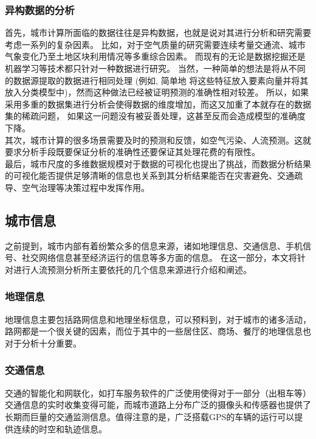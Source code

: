 \subsubsection*{异构数据的分析}
首先，城市计算所面临的数据往往是异构数据，也就是说对其进行分析和研究需要考虑一系列的复杂因素。 比如，对于空气质量的研究需要连续考量交通流、城市气象变化乃至土地区块利用情况等多重综合因素。 而现有的无论是数据挖掘还是机器学习等技术都只针对一种数据进行研究。 当然，一种简单的想法是将从不同的数据源提取的数据进行相同处理 (例如, 简单地
将这些特征放入要素向量并将其放入分类模型中)，然而这种做法已经被证明预测的准确性相对较差\cite{yuan2012discovering}。 所以，如果采用多重的数据集进行分析会使得数据的维度增加，而这又加重了本就存在的数据集的稀疏问题， 如果这一问题没有被妥善处理，这甚至反而会造成模型的准确度下降。 \\
\indent 其次，城市计算的很多场景需要及时的预测和反馈，如空气污染、人流预测。这就要求分析手段既要保证分析的准确性还要保证其处理花费的有限性。
\\
\indent 最后，城市尺度的多维数据规模对于数据的可视化也提出了挑战，而数据分析结果的可视化能否提供足够清晰的信息也关系到其分析结果能否在灾害避免、交通疏导、空气治理等决策过程中发挥作用。


\subsection{城市信息}
之前提到，城市内部有着纷繁众多的信息来源，诸如地理信息、交通信息、手机信号、社交网络信息甚至经济运行的信息等多方面的信息。 在这一部分，本文将针对进行人流预测分析所主要依托的几个信息来源进行介绍和阐述。
\subsubsection*{地理信息}
地理信息主要包括路网信息和地理坐标信息，可以预料到，对于城市的诸多活动，路网都是一个很关键的因素，而位于其中的一些居住区、商场、餐厅的地理信息也对于分析十分重要。
\subsubsection*{交通信息}
交通的智能化和网联化，如打车服务软件的广泛使用使得对于一部分（出租车等）交通信息的实时收集变得可能，而城市道路上分布广泛的摄像头和传感器也提供了长期而巨量的交通监测信息。值得注意的是，广泛搭载GPS的车辆的运行可以提供连续的时空和轨迹信息。
